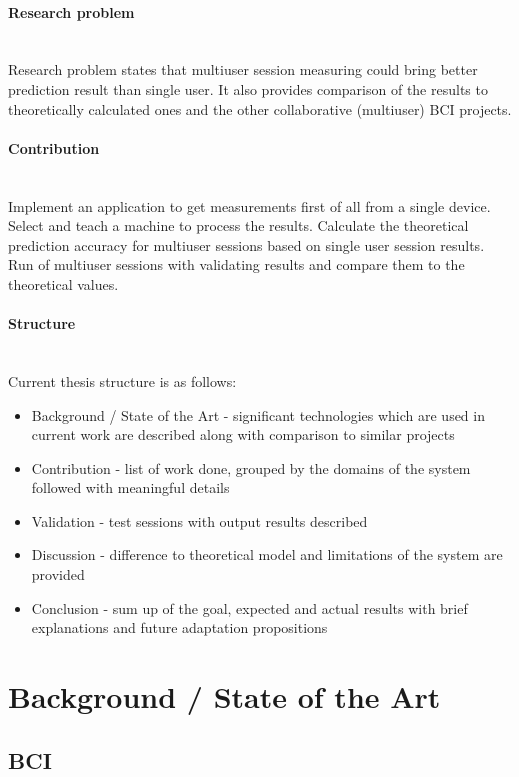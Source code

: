 \documentclass[12pt]{article}
\begin{document}
\paragraph{Research problem}~\\

Research problem states that multiuser session measuring could bring better prediction result than single user. It also provides comparison of the results to theoretically calculated ones and the other collaborative (multiuser) BCI projects.
\paragraph{Contribution}~\\

Implement an application to get measurements first of all from a single device. Select and teach a machine to process the results. Calculate the theoretical prediction accuracy for multiuser sessions based on single user session results. Run of multiuser sessions with validating results and compare them to the theoretical values.
\paragraph{Structure}~\\
Current thesis structure is as follows:

\begin{itemize}
\item Background / State of the Art - significant technologies which are used in current work are described along with comparison to similar projects
\item Contribution - list of work done, grouped by the domains of the system followed with meaningful details
\item Validation - test sessions with output results described
\item Discussion - difference to theoretical model and limitations of the system are provided
\item Conclusion - sum up of the goal, expected and actual results with brief explanations and future adaptation propositions
\end{itemize}

\newpage
\section{Background / State of the Art} 

\subsection{BCI}
\end{document}
